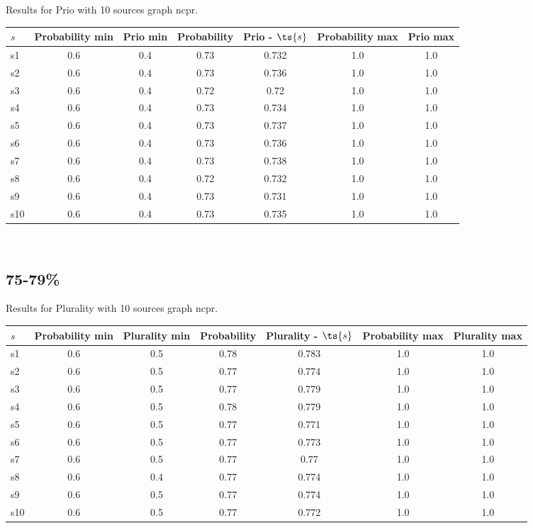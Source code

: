\documentclass{article}
\begin{document}
\noindent Results for Prio with 10 sources graph ncpr.

\noindent\begin{tabular}{|l|c|c|c|c|c|c|}
\hline
$s$& Probability min & Prio min & Probability & Prio - $\ts{s}$ & Probability max & Prio max\\
\hline
s1 &0.6 & 0.4 & 0.73 & 0.732 & 1.0 & 1.0\\
\hline
s2 &0.6 & 0.4 & 0.73 & 0.736 & 1.0 & 1.0\\
\hline
s3 &0.6 & 0.4 & 0.72 & 0.72 & 1.0 & 1.0\\
\hline
s4 &0.6 & 0.4 & 0.73 & 0.734 & 1.0 & 1.0\\
\hline
s5 &0.6 & 0.4 & 0.73 & 0.737 & 1.0 & 1.0\\
\hline
s6 &0.6 & 0.4 & 0.73 & 0.736 & 1.0 & 1.0\\
\hline
s7 &0.6 & 0.4 & 0.73 & 0.738 & 1.0 & 1.0\\
\hline
s8 &0.6 & 0.4 & 0.72 & 0.732 & 1.0 & 1.0\\
\hline
s9 &0.6 & 0.4 & 0.73 & 0.731 & 1.0 & 1.0\\
\hline
s10 &0.6 & 0.4 & 0.73 & 0.735 & 1.0 & 1.0\\
\hline
\end{tabular}\\

\newpage

\subsection{75-79\%}

\noindent Results for Plurality with 10 sources graph ncpr.

\noindent\begin{tabular}{|l|c|c|c|c|c|c|}
\hline
$s$& Probability min & Plurality min & Probability & Plurality - $\ts{s}$ & Probability max & Plurality max\\
\hline
s1 &0.6 & 0.5 & 0.78 & 0.783 & 1.0 & 1.0\\
\hline
s2 &0.6 & 0.5 & 0.77 & 0.774 & 1.0 & 1.0\\
\hline
s3 &0.6 & 0.5 & 0.77 & 0.779 & 1.0 & 1.0\\
\hline
s4 &0.6 & 0.5 & 0.78 & 0.779 & 1.0 & 1.0\\
\hline
s5 &0.6 & 0.5 & 0.77 & 0.771 & 1.0 & 1.0\\
\hline
s6 &0.6 & 0.5 & 0.77 & 0.773 & 1.0 & 1.0\\
\hline
s7 &0.6 & 0.5 & 0.77 & 0.77 & 1.0 & 1.0\\
\hline
s8 &0.6 & 0.4 & 0.77 & 0.774 & 1.0 & 1.0\\
\hline
s9 &0.6 & 0.5 & 0.77 & 0.774 & 1.0 & 1.0\\
\hline
s10 &0.6 & 0.5 & 0.77 & 0.772 & 1.0 & 1.0\\
\hline
\end{tabular}\\
\end{document}
